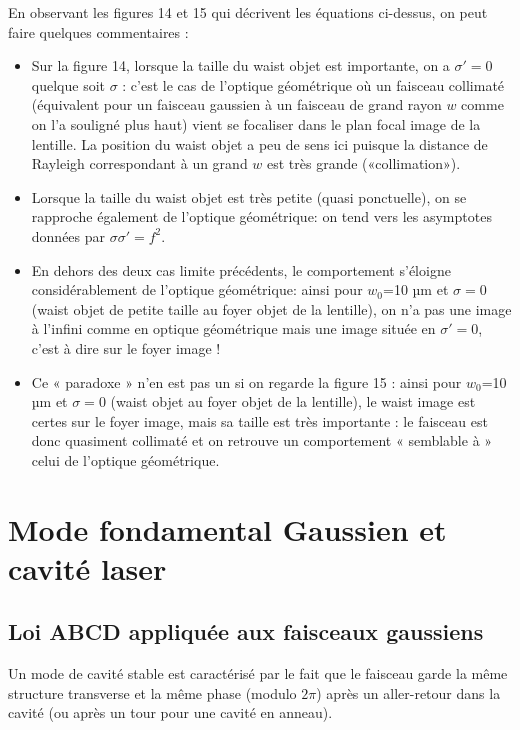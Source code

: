 \documentclass{book}
\begin{document}
En observant les figures 14 et 15 qui décrivent les équations ci-dessus, on peut faire quelques commentaires :

\begin{itemize}
    \item Sur la figure 14, lorsque la taille du waist objet est importante, on a $\sigma ' = 0$ quelque soit $\sigma$ : c'est le cas de l'optique géométrique où un faisceau collimaté (équivalent pour un faisceau gaussien à un faisceau de grand rayon $w$ comme on l'a souligné plus haut) vient se focaliser dans le plan focal image de la lentille. La position du waist objet a peu de sens ici puisque la distance de Rayleigh correspondant à un grand $w$ est très grande («collimation»).
    \item Lorsque la taille du waist objet est très petite (quasi ponctuelle), on se rapproche également de l'optique géométrique: on tend vers les asymptotes données par $\sigma \sigma ' = f^2$.
    \item En dehors des deux cas limite précédents, le comportement s'éloigne considérablement de l'optique géométrique: ainsi pour $w_0$=10 µm et $\sigma=0$(waist objet de petite taille au foyer objet de la lentille), on n'a pas une image à l'infini comme en optique géométrique mais une image située en $\sigma ' = 0$, c'est à dire sur le foyer image !
    \item Ce « paradoxe » n'en est pas un si on regarde la figure 15 : ainsi pour $w_0$=10 µm et $\sigma=0$ (waist objet au foyer objet de la lentille), le waist image est certes sur le foyer image, mais sa taille est très importante : le faisceau est donc quasiment collimaté et on retrouve un comportement « semblable à » celui de l'optique géométrique. 
\end{itemize}

\section{Mode fondamental Gaussien et cavité laser}
\subsection{Loi ABCD appliquée aux faisceaux gaussiens}

Un mode de cavité stable est caractérisé par le fait que le faisceau garde la même structure transverse et la même phase (modulo \(2 \pi\)) après un aller-retour dans la cavité (ou après un tour pour une cavité en anneau).
        
\end{document}

